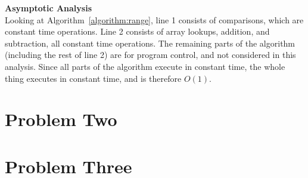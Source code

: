 \documentclass[10pt]{article}
\begin{document}
\textbf{Asymptotic Analysis}\\
Looking at Algorithm~\ref{algorithm:range}, line 1 consists of comparisons, which are constant time operations.
Line 2 consists of array lookups, addition, and subtraction, all constant time operations.
The remaining parts of the algorithm (including the rest of line 2) are for program control, and not considered in this analysis. Since all parts of the algorithm execute in constant time, the whole thing executes in constant time, and is therefore $O(1)$.


\pagebreak

\section{Problem Two}


\pagebreak

\section{Problem Three}


\pagebreak


 
\end{document}
